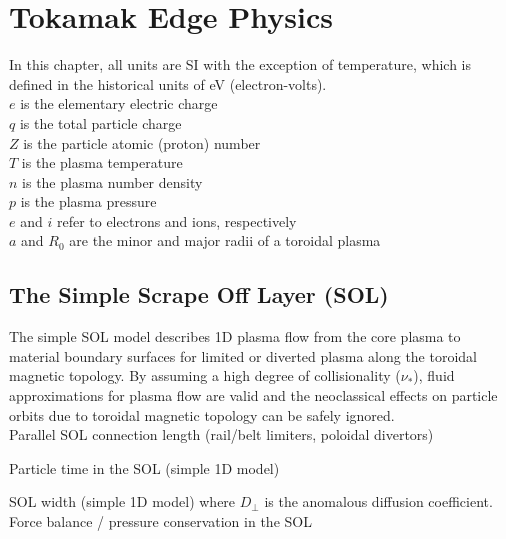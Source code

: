 \chapter{Tokamak Edge Physics}
In this chapter, all units are SI with the exception of temperature,
which is defined in the historical units of eV (electron-volts).\\

\noindent
$e$ is the elementary electric charge\\
$q$ is the total particle charge\\
$Z$ is the particle atomic (proton) number\\
$T$ is the plasma temperature\\
$n$ is the plasma number density\\
$p$ is the plasma pressure\\
$e$ and $i$ refer to electrons and ions, respectively\\
$a$ and $R_0$ are the minor and major radii of a toroidal plasma\\

\section{The Simple Scrape Off Layer (SOL)}
The simple SOL model describes 1D plasma flow from the core plasma to
material boundary surfaces for limited or diverted plasma along the
toroidal magnetic topology.  By assuming a high degree of
collisionality ($\nu_*$), fluid approximations for plasma flow are valid
and the neoclassical effects on particle orbits due to toroidal
magnetic topology can be safely ignored.\\

\noindent
Parallel SOL connection length (rail/belt limiters, poloidal divertors) 

\noindent
Particle time in the SOL (simple 1D model) 

\noindent
SOL width (simple 1D model) 
\indent where $D_\perp$ is the anomalous diffusion coefficient.\\

\noindent
Force balance / pressure conservation in the SOL 

